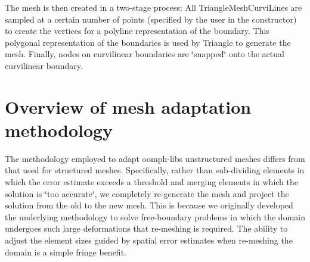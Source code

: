 The mesh is then created in a two-\/stage process\+: All {\ttfamily Triangle\+Mesh\+Curvi\+Lines} are sampled at a certain number of points (specified by the user in the constructor) to create the vertices for a polyline representation of the boundary. This polygonal representation of the boundaries is used by {\ttfamily Triangle} to generate the mesh. Finally, nodes on curvilinear boundaries are \char`\"{}snapped\char`\"{} onto the actual curvilinear boundary.



 

\hypertarget{index_adapt}{}\section{Overview of mesh adaptation methodology}\label{index_adapt}
The methodology employed to adapt {\ttfamily oomph-\/lib\textquotesingle{}s} unstructured meshes differs from that used for structured meshes. Specifically, rather than sub-\/dividing elements in which the error estimate exceeds a threshold and merging elements in which the solution is \char`\"{}too accurate\char`\"{}, we completely re-\/generate the mesh and project the solution from the old to the new mesh. This is because we originally developed the underlying methodology to solve free-\/boundary problems in which the domain undergoes such large deformations that re-\/meshing is required. The ability to adjust the element sizes guided by spatial error estimates when re-\/meshing the domain is a simple fringe benefit.

